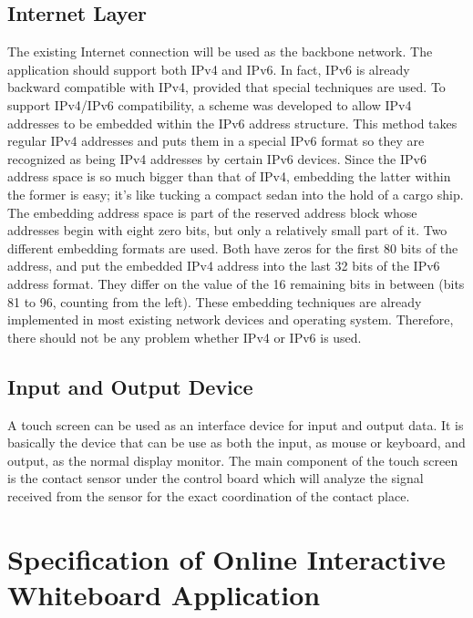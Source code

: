 \documentclass[conference]{IEEEtran}
\begin{document}
\subsection{Internet Layer}

The existing Internet connection will be used as the backbone network. 
The application should support both IPv4 and IPv6. 
In fact, IPv6 is already backward compatible with IPv4, provided that special techniques are used.
To support IPv4/IPv6 compatibility, a scheme was developed to allow IPv4 addresses to be embedded within the IPv6 address structure. 
This method takes regular IPv4 addresses and puts them in a special IPv6 format so they are recognized as being IPv4 addresses by certain IPv6 devices.
Since the IPv6 address space is so much bigger than that of IPv4, embedding the latter within the former is easy; it's like tucking a compact sedan into the hold of a cargo ship. 
The embedding address space is part of the reserved address block whose addresses begin with eight zero bits, but only a relatively small part of it.
Two different embedding formats are used. 
Both have zeros for the first 80 bits of the address, and put the embedded IPv4 address into the last 32 bits of the IPv6 address format. 
They differ on the value of the 16 remaining bits in between (bits 81 to 96, counting from the left). 
These embedding techniques are already implemented in most existing network devices and operating system. Therefore, there should not be any problem whether IPv4 or IPv6 is used.

\subsection{Input and Output Device}

A touch screen can be used as an interface device for input and output data. 
It is basically the device that can be use as both the input, as mouse or keyboard, and output, as the normal display monitor. 
The main component of the touch screen is the contact sensor under the control board which will analyze the signal received from the sensor for the exact coordination of the contact place. 

\section{Specification of Online Interactive Whiteboard Application}
\end{document}
